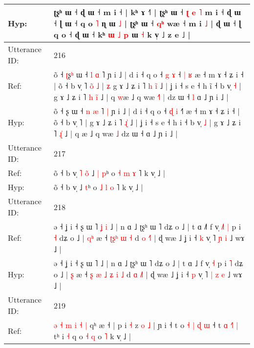 \documentclass[10pt]{article}
\DeclareRobustCommand{\hl}[1]{{\textcolor{red}{#1}}}
\begin{document}
\begin{longtable}{ll}
 \\
Hyp: & ʈʂʰ ɯ ˧ ɖ ɯ ˧ m i ˧ | kʰ ɤ ˧˥ | ʈʂʰ ɯ ˧ \hl{ʈ} \hl{e} \hl{˥} m\hl{}\hl{}\hl{}\hl{}\hl{}\hl{} i\hl{} ˧\hl{}\hl{} ɖ ɯ ˧ ɭ ɯ ˧ q o \hl{˥} ɳ ɯ \hl{˩} | ʈʂʰ ɯ ˧ \hl{q}\hl{ʰ} wæ ˧ m\hl{}\hl{}\hl{}\hl{}\hl{}\hl{} i\hl{} \hl{˩} | ɖ ɯ ˧ ɭ\hl{}\hl{}\hl{}\hl{} q o ˧\hl{}\hl{} ɖ ɯ ˧ kʰ \hl{ɯ} \hl{˩} \hl{p} ɯ \hl{˧} k v̩ ˩ z e ˩ |
 \\
\midrule
Utterance ID: & 216 \\
Ref: & õ ˧ \hl{ʈ}ʂ\hl{ʰ} ɯ ˧ \hl{l} \hl{ɑ} ˥\hl{}\hl{} ɲ i ˩ | d i ˧ q o ˧ \hl{g} \hl{ɤ} ˧\hl{ }\hl{|}\hl{ }\hl{ʁ} æ ˧ m ɤ ˧ ʑ i ˧ | õ ˧ b v̩ ˥\hl{ }\hl{o}\hl{̃}\hl{ }\hl{˩} |\hl{ }\hl{ʑ} g ɤ ˩ ʑ i ˥\hl{ }\hl{h} \hl{i}\hl{̃} ˩ | ʝ i ˧ s e ˧ h i\hl{̃} ˧ b v̩ \hl{˧} | g ɤ ˩ ʑ i ˥\hl{ }\hl{h} \hl{i}\hl{̃} ˩ | q \hl{w}æ ˩ q wæ\hl{ }\hl{˧}\hl{˥} \hl{|} dz ɯ ˧\hl{ }\hl{l} ɑ ˩ ɲ i ˩ |
 \\
Hyp: & õ ˧ \hl{}ʂ\hl{} ɯ ˧ \hl{n} \hl{æ} ˥\hl{ }\hl{|} ɲ i ˩ | d i ˧ q o ˧ \hl{ɖ} \hl{i} ˧\hl{}\hl{}\hl{}\hl{˥} æ ˧ m ɤ ˧ ʑ i ˧ | õ ˧ b v̩ ˥\hl{}\hl{}\hl{}\hl{}\hl{} |\hl{}\hl{} g ɤ ˩ ʑ i ˥\hl{}\hl{} \hl{ɻ}\hl{̍} ˩ | ʝ i ˧ s e ˧ h i\hl{} ˧ b v̩ \hl{˩} | g ɤ ˩ ʑ i ˥\hl{}\hl{} \hl{ɻ}\hl{̍} ˩ | q \hl{}æ ˩ q wæ\hl{}\hl{}\hl{} \hl{˩} dz ɯ ˧\hl{}\hl{} ɑ ˩ ɲ i ˩ |
 \\
\midrule
Utterance ID: & 217 \\
Ref: & õ ˧ b v̩\hl{ }\hl{˥}\hl{ }\hl{o}\hl{̃} ˩\hl{ }\hl{|} \hl{p}ʰ o \hl{˧} \hl{m} \hl{ɤ} ˥ k v̩ ˩ |
 \\
Hyp: & õ ˧ b v̩\hl{}\hl{}\hl{}\hl{}\hl{} ˩\hl{}\hl{} \hl{t}ʰ o \hl{˩} \hl{l} \hl{o} ˥ k v̩ ˩ |
 \\
\midrule
Utterance ID: & 218 \\
Ref: & ə ˧ ʝ i ˧ ʂ ɯ ˥\hl{ }\hl{ʝ}\hl{ }\hl{i} ˩ | n ɑ ˩ ʈʂʰ ɯ ˥ dʑ o ˩ | t ɑ ˩\hl{˥} f v̩\hl{ }\hl{˩}\hl{˥} \hl{|} p i \hl{˧} dʑ o ˩ | \hl{q}\hl{ʰ} æ ˧\hl{}\hl{}\hl{}\hl{} \hl{ʈ}\hl{ʂ}\hl{ʰ} \hl{ɯ} \hl{˧} d \hl{o} \hl{˧}˥ | ɖ wæ ˩ ʝ i ˧ \hl{k} v̩ ˥\hl{}\hl{} \hl{ɲ} \hl{i} ˩ wɤ ˩ |
 \\
Hyp: & ə ˧ ʝ i ˧ ʂ ɯ ˥\hl{}\hl{}\hl{}\hl{} ˩ | n ɑ ˩ ʈʂʰ ɯ ˥ dʑ o ˩ | t ɑ ˩\hl{} f v̩\hl{}\hl{}\hl{} \hl{˧} p i \hl{˥} dʑ o ˩ | \hl{}\hl{ʂ} æ ˧\hl{ }\hl{ʂ}\hl{ }\hl{æ} \hl{˩}\hl{ }\hl{ʑ} \hl{i} \hl{˩} d \hl{ɑ} \hl{˩}˥ | ɖ wæ ˩ ʝ i ˧ \hl{p} v̩ ˥\hl{ }\hl{|} \hl{z} \hl{e} ˩ wɤ ˩ |
 \\
\midrule
Utterance ID: & 219 \\
Ref: & \hl{}\hl{ə} \hl{˧} \hl{m} \hl{i} \hl{˧} \hl{|} qʰ æ ˧\hl{} | p i\hl{ }\hl{˧} z\hl{ }\hl{o}\hl{ }\hl{˩} | ɲ i ˧ t o\hl{ }\hl{˧}\hl{ }\hl{|}\hl{ }\hl{ɖ}\hl{ }\hl{ɯ} ˧ t \hl{ɑ} \hl{˧}˥\hl{ }\hl{|} tʰ i \hl{˧} q o \hl{˧} \hl{q} o \hl{˥} k v̩\hl{}\hl{}\hl{}\hl{} ˩ |

\end{longtable}
\end{document}
